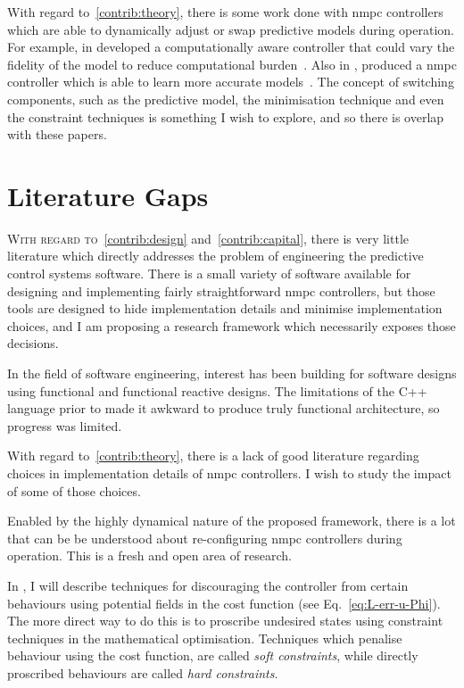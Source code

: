 With regard to~\ref{contrib:theory}, there is some work done with \ac{nmpc}
controllers which are able to dynamically adjust or swap predictive models
during operation. For example, in  \citeauthor[and related
work]{Zhang2016} developed a computationally aware controller that could vary
the fidelity of the model to reduce computational burden~\cite[and related
work]{Zhang2016}. Also in , \citeauthor{Ostafew2016} produced a
\ac{nmpc} controller which is able to learn more accurate
models~\cite{Ostafew2016}. The concept of switching components, such as the
predictive model, the minimisation technique and even the constraint techniques
is something I wish to explore, and so there is overlap with these papers.



\section{Literature Gaps}%
\label{sec:literature-gaps}


\textsc{With regard to}~\ref{contrib:design} and~\ref{contrib:capital}, there is
very little literature which directly addresses the problem of engineering the
predictive control systems software. There is a small variety of software
available for designing and implementing fairly straightforward \ac{nmpc}
controllers, but those tools are designed to hide implementation details and
minimise implementation choices, and I am proposing a research framework which
necessarily exposes those decisions.

In the field of software engineering, interest has been building for software
designs using functional and functional reactive designs. The limitations of the
C++ language prior to  made it awkward to produce truly functional
architecture, so progress was limited.

With regard to~\ref{contrib:theory}, there is a lack of good literature
regarding choices in implementation details of \ac{nmpc} controllers. I wish to
study the impact of some of those choices.

Enabled by the highly dynamical nature of the proposed framework, there is a lot
that can be be understood about re-configuring \ac{nmpc} controllers during
operation. This is a fresh and open area of research.

In , I will describe techniques for discouraging the controller
from certain behaviours using potential fields in the cost function (see
Eq.~\eqref{eq:L-err-u-Phi}). The more direct way to do this is to proscribe
undesired states using constraint techniques in the mathematical
optimisation.
Techniques which penalise behaviour using the cost function, are called
\emph{soft constraints}, while directly proscribed behaviours are called
\emph{hard constraints}.

